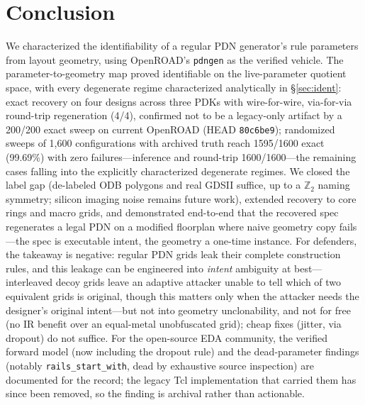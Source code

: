 \documentclass[11pt]{article}
\begin{document}
\section{Conclusion}

We characterized the identifiability of a regular PDN generator's rule
parameters from layout geometry, using OpenROAD's \texttt{pdngen} as the
verified vehicle.  The parameter-to-geometry map proved identifiable on the live-parameter quotient space, with
every degenerate regime characterized analytically in
\S\ref{sec:ident}: exact recovery on four designs across three PDKs
with wire-for-wire, via-for-via round-trip regeneration (4/4),
confirmed not to be a legacy-only artifact by a 200/200 exact sweep on
current OpenROAD (HEAD \texttt{80c6be9}); randomized sweeps of 1{,}600
configurations with archived truth reach 1595/1600 exact (99.69\%)
with zero failures---inference and round-trip 1600/1600---the remaining
cases falling into the explicitly characterized degenerate regimes.  We closed the label gap
(de-labeled ODB polygons and real GDSII suffice, up to a
$\mathbb{Z}_2$ naming symmetry; silicon imaging noise remains future
work), extended recovery to core rings and macro grids, and demonstrated
end-to-end that the recovered spec regenerates a legal PDN on a modified
floorplan where naive geometry copy fails---the spec is executable
intent, the geometry a one-time instance.  For defenders, the takeaway
is negative: regular PDN grids leak their complete construction rules,
and this leakage can be engineered into \emph{intent} ambiguity at
best---interleaved decoy grids leave an adaptive attacker unable to tell
which of two equivalent grids is original, though this matters only when
the attacker needs the designer's original intent---but not into geometry
unclonability, and not for free (no IR benefit over an equal-metal
unobfuscated grid); cheap fixes (jitter, via dropout) do not suffice.
For the open-source EDA community, the verified forward model (now
including the dropout rule) and the dead-parameter findings (notably
\texttt{rails\_start\_with}, dead by exhaustive source inspection) are
documented for the record; the legacy Tcl implementation that carried
them has since been removed, so the finding is archival rather than
actionable.
\end{document}
